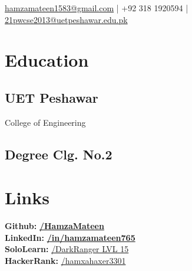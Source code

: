 \documentclass[]{deedy-resume-openfont}
\begin{document}
%
%

%
%
{ 
    \href{mailto:hamzamateen1583@gmail.com}{hamzamateen1583@gmail.com} | +92 318 1920594 | \href{mailto:21pwcse2013@uetpeshawar.edu.pk}{21pwcse2013@uetpeshawar.edu.pk}
}

%
%

\begin{minipage}[t]{0.33\textwidth} 


\section{Education} 

\subsection{UET Peshawar}
College of Engineering \\
\sectionsep

\subsection{Degree Clg. No.2}
\sectionsep


\section{Links} 
\textbf{Github:} \href{https://github.com/HamzaMateen}{\bf /HamzaMateen} \\
\textbf{LinkedIn:} \href{https://www.linkedin.com/in/hamzamateen765}{\bf /in/hamzamateen765} \\
\textbf{SoloLearn:} \href{https://www.sololearn.com/profile/9691975}{/DarkRanger LVL 15} \\
\textbf{HackerRank:} \href{https://www.hackerrank.com/hamxahaxer3301}{/hamxahaxer3301}


\end{minipage}
\end{document}

